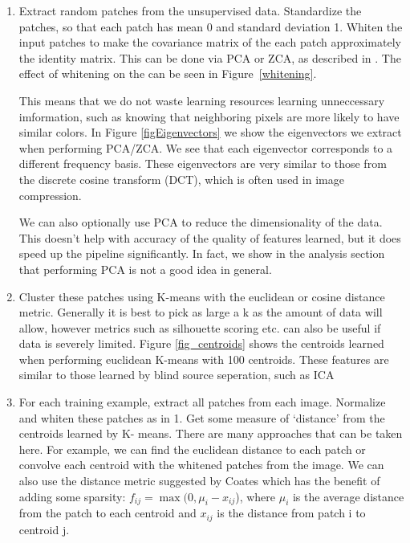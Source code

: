 \documentclass{article} %
\begin{document}
\begin{enumerate}
\item Extract random patches from the unsupervised data. Standardize the patches, so that each patch has mean 0 and standard deviation 1. Whiten the input patches to make the covariance matrix of the each patch approximately the identity matrix. This can be done via PCA or ZCA, as described in \cite{kriz}. The effect of whitening on the can be seen in Figure~\ref{whitening}.

  This means that we do not waste learning resources learning unneccessary imformation, such as knowing that neighboring pixels are more likely to have similar colors.
  In Figure \ref{figEigenvectors} we show the eigenvectors we extract when performing PCA/ZCA. We see that each eigenvector corresponds to a different frequency basis. These eigenvectors are very similar to those from the discrete cosine transform (DCT), which is often used in image compression.

  We can also optionally use PCA to reduce the dimensionality of the data. This doesn’t help with accuracy of the quality of features learned, but it does speed up the pipeline significantly. In fact, we show in the analysis section that performing PCA is not a good idea in general.

\item Cluster these patches using K-means with the euclidean or cosine distance metric. Generally it is best to pick as large a k as the amount of data will allow, however metrics such as silhouette scoring etc. can also be useful if data is severely limited. Figure \ref{fig_centroids} shows the centroids learned when performing euclidean K-means with 100 centroids. These features are similar to those learned by blind source seperation, such as ICA \cite{hoyer}

\item For each training example, extract all patches from each image. Normalize and whiten these patches as in 1. Get some measure of ‘distance’ from the centroids learned by K- means. There are many approaches that can be taken here. For example, we can find the euclidean distance to each patch or convolve each centroid with the whitened patches from the image. We can also use the distance metric suggested by Coates which has the benefit of adding some sparsity: $f_{ij} = \max(0, \mu_i - x_{ij}$), where $\mu_i$ is the average distance from the patch to each centroid and $x_{ij}$ is the distance from patch i to centroid j.


\end{enumerate}
\end{document}

